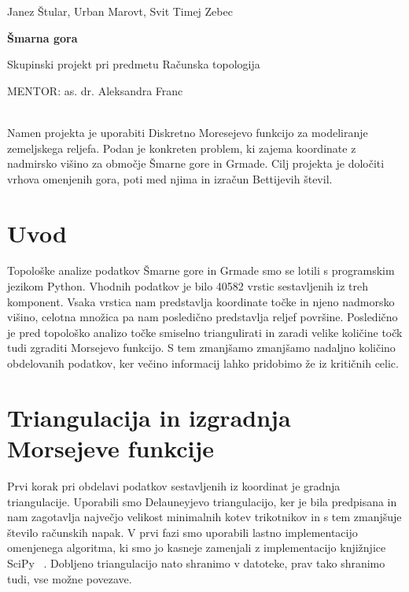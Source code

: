 \documentclass{article}
\begin{document}
\begin{center} {\large Janez Štular, Urban Marovt, Svit Timej Zebec} \end{center}
\begin{center} {\Large \textbf{Šmarna gora}} \end{center}
\begin{center} {\large Skupinski projekt pri predmetu Računska topologija} \end{center}
\begin{center} {\large MENTOR: as. dr. Aleksandra Franc} \end{center}
\\
Namen projekta je uporabiti Diskretno Moresejevo funkcijo za modeliranje zemeljskega reljefa. Podan je konkreten problem, ki zajema koordinate z nadmirsko višino za območje Šmarne  gore in Grmade. Cilj projekta je določiti vrhova omenjenih gora, poti med njima in izračun Bettijevih števil.

\section{Uvod}
Topološke analize podatkov Šmarne gore in Grmade smo se lotili s programskim jezikom Python. Vhodnih podatkov je bilo 40582 vrstic sestavljenih iz treh komponent. Vsaka vrstica nam predstavlja koordinate točke in njeno nadmorsko višino, celotna množica pa nam posledično predstavlja reljef površine. Posledično je pred topološko analizo točke smiselno triangulirati in zaradi velike količine točk tudi zgraditi Morsejevo funkcijo. S tem zmanjšamo zmanjšamo nadaljno količino obdelovanih podatkov, ker večino informacij lahko pridobimo že iz kritičnih celic.

\section{Triangulacija in izgradnja Morsejeve funkcije}
Prvi korak pri obdelavi podatkov sestavljenih iz koordinat je gradnja triangulacije. Uporabili smo Delauneyjevo triangulacijo, ker je bila predpisana in nam zagotavlja največjo velikost minimalnih kotev trikotnikov in s tem zmanjšuje število računskih napak. V prvi fazi smo uporabili lastno implementacijo omenjenega algoritma, ki smo jo kasneje zamenjali z implementacijo knjižnjice SciPy ~\cite{SciPy}. Dobljeno triangulacijo nato shranimo v datoteke, prav tako shranimo tudi, vse možne povezave.
\end{document}
